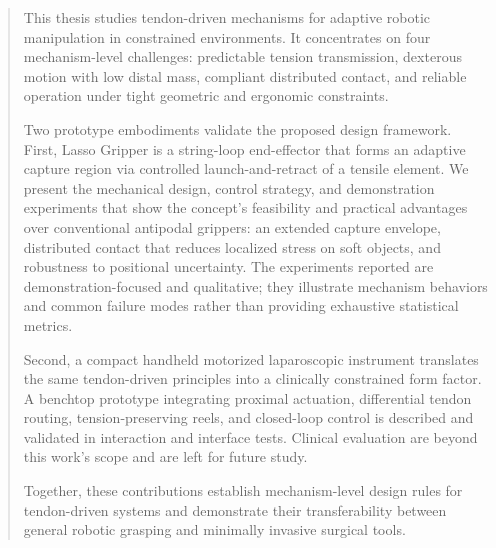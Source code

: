 \begin{abstract}
\addchaptertocentry{\abstractname}
\bigskip

This thesis studies tendon-driven mechanisms for adaptive robotic manipulation in constrained environments. It concentrates on four mechanism-level challenges: predictable tension transmission, dexterous motion with low distal mass, compliant distributed contact, and reliable operation under tight geometric and ergonomic constraints.

Two prototype embodiments validate the proposed design framework. First, Lasso Gripper is a string-loop end-effector that forms an adaptive capture region via controlled launch-and-retract of a tensile element. We present the mechanical design, control strategy, and demonstration experiments that show the concept's feasibility and practical advantages over conventional antipodal grippers: an extended capture envelope, distributed contact that reduces localized stress on soft objects, and robustness to positional uncertainty. The experiments reported are demonstration-focused and qualitative; they illustrate mechanism behaviors and common failure modes rather than providing exhaustive statistical metrics.

Second, a compact handheld motorized laparoscopic instrument translates the same tendon-driven principles into a clinically constrained form factor. A benchtop prototype integrating proximal actuation, differential tendon routing, tension-preserving reels, and closed-loop control is described and validated in interaction and interface tests. Clinical evaluation are beyond this work's scope and are left for future study.

Together, these contributions establish mechanism-level design rules for tendon-driven systems and demonstrate their transferability between general robotic grasping and minimally invasive surgical tools.
\end{abstract}
